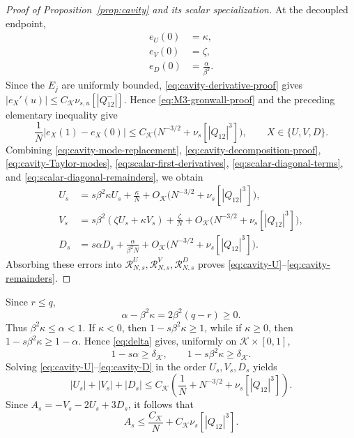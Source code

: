 \documentclass[11pt]{article}
\numberwithin{equation}{section}
\newcommand{\1}{\mathbf 1}
\newcommand{\cK}{\mathcal K}
\begin{document}
\begin{proof}[Proof of Proposition~\ref{prop:cavity} and its scalar specialization]
At the decoupled endpoint,
\begin{align}
 e_U(0)&=\kappa,\nonumber\\
 e_V(0)&=\zeta,
 \label{eq:scalar-diagonal-terms}\\
 e_D(0)&=\frac{\alpha}{\beta^2}.\nonumber
\end{align}
Since the $E_j$ are uniformly bounded,
\eqref{eq:cavity-derivative-proof} gives
$|e_X'(u)|\le C_{\cK}\nu_{s,u}[|Q^-_{12}|]$.  Hence
\eqref{eq:M3-gronwall-proof} and the preceding elementary inequality give
\begin{equation}
 \frac1N|e_X(1)-e_X(0)|
 \le C_{\cK}\bigl(N^{-3/2}+\nu_s[|Q_{12}|^3]\bigr),
 \qquad X\in\{U,V,D\}.
 \label{eq:scalar-diagonal-remainders}
\end{equation}
Combining \eqref{eq:cavity-mode-replacement},
\eqref{eq:cavity-decomposition-proof},
\eqref{eq:cavity-Taylor-modes},
\eqref{eq:scalar-first-derivatives},
\eqref{eq:scalar-diagonal-terms}, and
\eqref{eq:scalar-diagonal-remainders}, we obtain
\[
 \begin{aligned}
 U_s&=s\beta^2\kappa U_s+\frac{\kappa}{N}
 +O_{\cK}\bigl(N^{-3/2}+\nu_s[|Q_{12}|^3]\bigr),\\
 V_s&=s\beta^2(\zeta U_s+\kappa V_s)+\frac{\zeta}{N}
 +O_{\cK}\bigl(N^{-3/2}+\nu_s[|Q_{12}|^3]\bigr),\\
 D_s&=s\alpha D_s+\frac{\alpha}{\beta^2N}
 +O_{\cK}\bigl(N^{-3/2}+\nu_s[|Q_{12}|^3]\bigr).
 \end{aligned}
\]
Absorbing these errors into
$\mathcal R^U_{N,s},\mathcal R^V_{N,s},\mathcal R^D_{N,s}$ proves
\eqref{eq:cavity-U}--\eqref{eq:cavity-remainders}.
\end{proof}

Since $r\le q$,
\[
 \alpha-\beta^2\kappa=2\beta^2(q-r)\ge0.
\]
Thus $\beta^2\kappa\le\alpha<1$.  If $\kappa<0$, then
$1-s\beta^2\kappa\ge1$, while if $\kappa\ge0$, then
$1-s\beta^2\kappa\ge1-\alpha$.  Hence \eqref{eq:delta} gives, uniformly
on $\cK\times[0,1]$,
\begin{equation}
 1-s\alpha\ge\delta_{\cK},\qquad
 1-s\beta^2\kappa\ge\delta_{\cK}.
 \label{eq:denominator-bounds}
\end{equation}
Solving \eqref{eq:cavity-U}--\eqref{eq:cavity-D} in the order
$U_s,V_s,D_s$ yields
\[
 |U_s|+|V_s|+|D_s|
 \le C_{\cK}\left(\frac1N+N^{-3/2}+\nu_s[|Q_{12}|^3]\right).
\]
Since $A_s=-V_s-2U_s+3D_s$, it follows that
\begin{equation}
 A_s\le\frac{C_{\cK}}N+C_{\cK}\nu_s[|Q_{12}|^3].
 \label{eq:preabsorb}
\end{equation}
\end{document}

